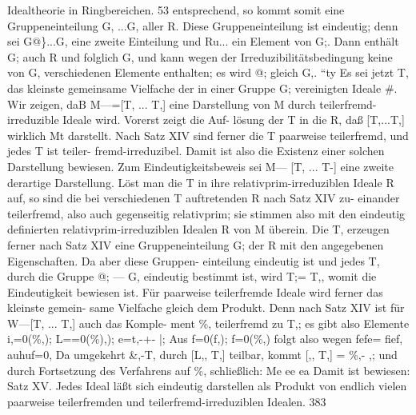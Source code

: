 \documentclass[11pt,a4paper]{article}
\theoremstyle{plain}
\theoremstyle{definition}
\begin{document}
Idealtheorie in Ringbereichen. 
53 
entsprechend, 
so kommt somit eine Gruppeneinteilung G, ...G, aller R. 
Diese Gruppeneinteilung 
ist eindeutig; 
denn 
sei G@\}...G, eine zweite 
Einteilung und Ru... 
ein Element von G;. Dann enthält G; auch R 
und folglich G, und kann wegen der Irreduzibilitätsbedingung keine von 
G, verschiedenen Elemente enthalten; es wird @; gleich G,. 
``ty 
Es sei jetzt T, das kleinste gemeinsame Vielfache der in einer Gruppe G; 
vereinigten Ideale \#. 
Wir zeigen, daB M---=[T, ... T,] eine Darstellung 
von M durch teilerfremd-irreduzible Ideale wird. 
Vorerst zeigt die Auf- 
lösung der T in die R, daß [T,...T,] 
wirklich Mt darstellt. 
Nach 
Satz XIV sind ferner die T paarweise teilerfremd, und jedes T ist teiler- 
fremd-irreduzibel. 
Damit ist also die Existenz einer solchen Darstellung 
bewiesen. 
Zum Eindeutigkeitsbeweis sei 
M--- [T, ... T-] eine zweite derartige 
Darstellung. 
Löst man 
die T in ihre relativprim-irreduziblen Ideale R 
auf, so sind die bei verschiedenen T auftretenden R nach Satz XIV zu- 
einander teilerfremd, also auch gegenseitig relativprim; 
sie stimmen also 
mit den eindeutig definierten relativprim-irreduziblen Idealen R von M 
überein. 
Die T, erzeugen ferner nach Satz XIV eine Gruppeneinteilung 
G; der R mit den angegebenen Eigenschaften. 
Da aber diese Gruppen- 
einteilung eindeutig ist und jedes T, durch die Gruppe @; --- G, eindeutig 
bestimmt ist, wird T;= T,, womit die Eindeutigkeit bewiesen ist. 
Für paarweise teilerfremde Ideale wird 
ferner das kleinste gemein- 
same Vielfache gleich dem Produkt. 
Denn nach Satz XIV 
ist für 
W---[T, ... T,] auch das Komple- 
ment \%, teilerfremd zu T,; es gibt also Elemente 
i,=0(\%,); 
L==0(\%),); 
e=t,-+- 
|; 
Aus f=0(f,); 
f=0(\%,) folgt also wegen 
fefe= fief, auhuf=0, 
Da umgekehrt \&,-T, durch [L,, T,] teilbar, kommt [,, T,] = \%,- ,; 
und durch Fortsetzung des Verfahrens auf \%, schließlich: 
Me ee 
ea 
Damit ist bewiesen: 
Satz XV. Jedes Ideal 
läßt sich eindeutig darstellen 
als Produkt 
von endlich vielen paarweise 
teilerfremden und teilerfremd-irreduziblen 
Idealen. 
383
\end{document}
